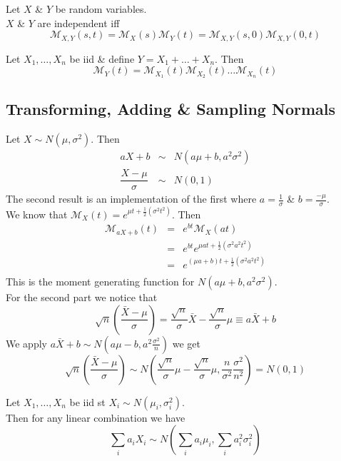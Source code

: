 \documentclass[11pt,a4paper]{article}
\begin{document}
Let $X$ \& $Y$ be random variables.\\
$X$ \& $Y$ are independent iff
$$\mathcal{M}_{X,Y}(s,t)=\mathcal{M}_X(s)\mathcal{M}_Y(t)=\mathcal{M}_{X,Y}(s,0)\mathcal{M}_{X,Y}(0,t)$$

Let $X_1,\dots,X_n$ be iid \& define $Y=X_1+\dots+X_n$. Then
$$\mathcal{M}_Y(t)=\mathcal{M}_{X_1}(t)\mathcal{M}_{X_2}(t)\dots\mathcal{M}_{X_n}(t)$$

\subsection{Transforming, Adding \& Sampling Normals}

Let $X\sim N(\mu,\sigma^2)$. Then
\[\begin{array}{rcl}
aX+b&\sim&N(a\mu+b,a^2\sigma^2)\\
\dfrac{X-\mu}{\sigma}&\sim&N(0,1)
\end{array}\]
\nb The second result is an implementation of the first where $a=\frac{1}{\sigma}$ \& $b=\frac{-\mu}{\sigma}$.\\

We know that $\mathcal{M}_X(t)=e^{\mu t+\frac{1}{2}(\sigma^2t^2)}$. Then\\
\[\begin{array}{rcl}
\mathcal{M}_{aX+b}(t)&=&e^{bt}\mathcal{M}_X(at)\\
&=&e^{bt}e^{\mu at+\frac{1}{2}(\sigma^2a^2t^2)}\\
&=&e^{(\mu a+b)t+\frac{1}{2}(\sigma^2a^2t^2)}\\
\end{array}\]
This is the moment generating function for $N(a\mu+b,a^2\sigma^2)$.\\
For the second part we notice that
$$\sqrt{n}\left(\frac{\bar{X}-\mu}{\sigma}\right)=\frac{\sqrt{n}}{\sigma}\bar{X}-\frac{\sqrt{n}}{\sigma}\mu\equiv a\bar{X}+b$$
We apply $a\bar{X}+b\sim N(a\mu-b,a^2\frac{\sigma^2}{n})$ we get
$$\sqrt{n}\left(\frac{\bar{X}-\mu}{\sigma}\right)\sim N\left(\frac{\sqrt{n}}{\sigma}\mu-\frac{\sqrt{n}}{\sigma}\mu,\frac{n}{\sigma^2}\frac{\sigma^2}{n^2}\right)=N(0,1)$$

Let $X_1,\dots,X_n$ be iid st $X_i\sim N(\mu_i,\sigma_i^2)$.\\
Then for any linear combination we have
$$\sum_ia_iX_i\sim N\left(\sum_ia_i\mu_i,\sum_ia_i^2\sigma^2_i\right)$$
\end{document}
